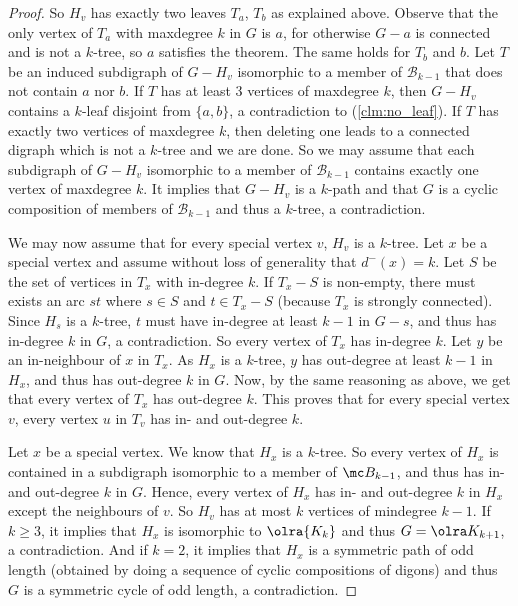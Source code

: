 \begin{proof}
So $H_v$ has exactly two leaves $T_a$, $T_b$ as explained above. 
Observe that the only vertex of $T_a$ with maxdegree $k$ in $G$ is $a$, for otherwise $G-a$ is connected and is not a $k$-tree, so $a$ satisfies the theorem. 
The same holds for $T_b$ and $b$. 
Let $T$ be an induced subdigraph of $G-H_v$ isomorphic to a member of $\mathcal B_{k-1}$ that does not contain $a$ nor $b$. 
If $T$ has at least $3$ vertices of maxdegree $k$, then $G-H_v$ contains a $k$-leaf disjoint from $\{a,b\}$, a contradiction to (\ref{clm:no_leaf}). 
If $T$ has exactly two vertices of maxdegree $k$, then deleting one leads to a connected digraph which is not a $k$-tree and we are done. 
So we may assume that each subdigraph of $G-H_v$ isomorphic to a member of $\mathcal B_{k-1}$ contains exactly one vertex of maxdegree $k$. 
It implies that $G-H_v$ is a $k$-path and that $G$ is a cyclic composition of members of $\mathcal B_{k-1}$ and thus a $k$-tree, a contradiction. 
\medskip

We may now assume that for every special vertex $v$, $H_v$ is a $k$-tree. 
Let $x$ be a special vertex and assume without loss of generality that $d^-(x) = k$. 
Let $S$ be the set of vertices in $T_x$ with in-degree $k$. 
If $T_x -S$ is non-empty, there must exists an arc $st$ where $s \in S$ and $t \in T_x - S$ (because $T_x$ is strongly connected).  
Since $H_s$ is a $k$-tree, $t$ must have in-degree at least $k-1$ in $G-s$, and thus has in-degree $k$ in $G$, a contradiction. So every vertex of $T_x$ has in-degree $k$. 
Let $y$ be an in-neighbour of $x$ in $T_x$. 
As $H_x$ is a $k$-tree, $y$ has out-degree at least $k-1$ in $H_x$, and thus has out-degree $k$ in $G$. Now, by the same reasoning as above, we get that every vertex of $T_x$ has out-degree $k$. 
This proves that for every special vertex $v$, every vertex $u$ in $T_v$ has in- and out-degree $k$.  

Let $x$ be a special vertex. We know that $H_x$ is a $k$-tree. So every vertex of $H_x$ is contained in a subdigraph isomorphic to a member of $\mc B_{k-1}$, and thus has in- and out-degree $k$ in $G$. 
Hence, every vertex of $H_x$ has in- and out-degree $k$ in $H_x$ except the neighbours of $v$. So $H_v$ has at most $k$ vertices of mindegree $k-1$. 
If $k \geq 3$, it implies that $H_x$ is isomorphic to $\olra{K_k}$ and thus $G = \olra K_{k+1}$, a contradiction. And if $k=2$, it implies that $H_x$ is a symmetric path of odd length (obtained by doing a sequence of cyclic compositions of digons) and thus $G$ is a symmetric cycle of odd length, a contradiction. 





\end{proof}

